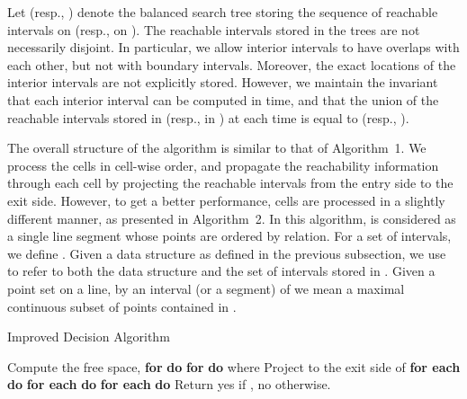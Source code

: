 \documentclass[12pt]{dalthesis}
\newcommand{\For}{{\bf for }}
\newcommand{\Foreach}{{\bf for each }}
\newcommand{\Do}{{\bf do }}
\begin{document}
Let  (resp., ) denote the balanced search tree
storing the sequence of reachable intervals on  (resp., on ).
The reachable intervals stored in the trees are not necessarily disjoint.
In particular, we allow interior intervals to have overlaps with each other, 
but not with boundary intervals.
Moreover, the exact locations of the interior intervals are not explicitly stored.
However, we maintain the invariant that 
each interior interval can be computed in  time, and that 
the union of the reachable intervals 
stored in  (resp., in ) 
at each time is equal to   (resp., ).

The overall structure of the algorithm is similar to that of Algorithm~1.
We process the cells in cell-wise order,
and propagate the reachability information through each cell
by projecting the reachable intervals from the entry side to the exit side.
However, to get a better performance, 
cells are processed in a slightly different manner, as presented in Algorithm~2.
In this algorithm,  is considered
as a single line segment whose points are ordered by  relation.
For a set  of intervals, we define .
Given a data structure  as defined in the previous subsection,
we use  to refer to both the data structure and the 
set of intervals stored in .
Given a point set  on a line, by an interval (or a segment) of  we mean 
a maximal continuous subset of points contained in .


\vspace{0.5em}
\begin{algorithm} [h]
\caption {\sc Improved Decision Algorithm} \label{alg:improved}
\begin{algorithmic}[1]
	\vspace{0.5em}
	\baselineskip

	\STATE\label{l:0} Compute the free space, 
	\STATE\label{l:1} \For  \Do  \STATE\label{l:2} \For  \Do 
	\STATE\label{l:3}  where 
	 \label{l:loop}
			\STATE\label{l:cat}   
			\STATE\label{l:cop} Project  to the exit side of 
\STATE\label{l:s} 
			\STATE\label{l:del} \Foreach  \Do 
			\STATE\label{l:spl} 
			\STATE\label{l:ins1} \Foreach  \Do  
			\STATE\label{l:ins2} \Foreach  \Do  
		\ENDFOR
	\ENDFOR
	\STATE\label{l:last} Return {\sc yes} if , {\sc no} otherwise. 

\end{algorithmic}
\end{algorithm}
\vspace{0.5em}
\end{document}
